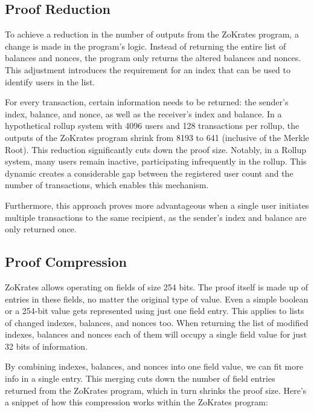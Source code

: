 \subsection{Proof Reduction}

To achieve a reduction in the number of outputs from the ZoKrates program, a change is made in the program's logic. Instead of returning the entire list of balances and nonces, the program only returns the altered balances and nonces. This adjustment introduces the requirement for an index that can be used to identify users in the list.

For every transaction, certain information needs to be returned: the sender's index, balance, and nonce, as well as the receiver's index and balance. In a hypothetical rollup system with 4096 users and 128 transactions per rollup, the outputs of the ZoKrates program shrink from 8193 to 641 (inclusive of the Merkle Root). This reduction significantly cuts down the proof size. Notably, in a Rollup system, many users remain inactive, participating infrequently in the rollup. This dynamic creates a considerable gap between the registered user count and the number of transactions, which enables this mechanism.

Furthermore, this approach proves more advantageous when a single user initiates multiple transactions to the same recipient, as the sender's index and balance are only returned once.

\subsection{Proof Compression \label{subsec:5_compression}}

ZoKrates allows operating on fields of size 254 bits. The proof itself is made up of entries in these fields, no matter the original type of value. Even a simple boolean or a 254-bit value gets represented using just one field entry. This applies to lists of changed indexes, balances, and nonces too. When returning the list of modified indexes, balances and nonces each of them will occupy a single field value for just 32 bits of information.

By combining indexes, balances, and nonces into one field value, we can fit more info in a single entry. This merging cuts down the number of field entries returned from the ZoKrates program, which in turn shrinks the proof size. Here's a snippet of how this compression works within the ZoKrates program:

